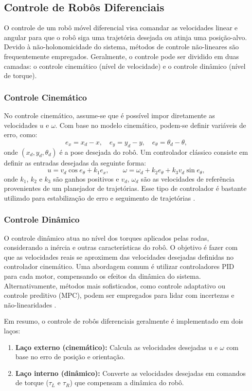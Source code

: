 \subsection{Controle de Robôs Diferenciais}
O controle de um robô móvel diferencial visa comandar as velocidades linear e angular para que o robô siga uma trajetória desejada ou atinja uma posição-alvo. Devido à não-holonomicidade do sistema, métodos de controle não-lineares são frequentemente empregados. Geralmente, o controle pode ser dividido em duas camadas: o controle cinemático (nível de velocidade) e o controle dinâmico (nível de torque).

\subsubsection{Controle Cinemático}
No controle cinemático, assume-se que é possível impor diretamente as velocidades $u$ e $\omega$. Com base no modelo cinemático, podem-se definir variáveis de erro, como:
\[
e_x = x_d - x, \quad e_y = y_d - y, \quad e_\theta = \theta_d - \theta,
\]
onde $(x_d, y_d, \theta_d)$ é a pose desejada do robô. Um controlador clássico consiste em definir as entradas desejadas da seguinte forma:
\begin{equation}\label{eq:controle_cinematico}
    u = v_d \cos e_\theta + k_1 e_x, \qquad \omega = \omega_d + k_2 e_\theta + k_3 v_d \sin e_\theta,
\end{equation}
onde $k_1$, $k_2$ e $k_3$ são ganhos positivos e $v_d$, $\omega_d$ são as velocidades de referência provenientes de um planejador de trajetórias. Esse tipo de controlador é bastante utilizado para estabilização de erro e seguimento de trajetórias \cite{Kanayama1990}.

\subsubsection{Controle Dinâmico}
O controle dinâmico atua no nível dos torques aplicados pelas rodas, considerando a inércia e outras características do robô. O objetivo é fazer com que as velocidades reais se aproximem das velocidades desejadas definidas no controlador cinemático. Uma abordagem comum é utilizar controladores PID para cada motor, compensando os efeitos da dinâmica do sistema. Alternativamente, métodos mais sofisticados, como controle adaptativo ou controle preditivo (MPC), podem ser empregados para lidar com incertezas e não-linearidades \cite{Harasim2016}.

Em resumo, o controle de robôs diferenciais geralmente é implementado em dois laços:
\begin{enumerate}
    \item \textbf{Laço externo (cinemático):} Calcula as velocidades desejadas $u$ e $\omega$ com base no erro de posição e orientação.
    \item \textbf{Laço interno (dinâmico):} Converte as velocidades desejadas em comandos de torque ($\tau_L$ e $\tau_R$) que compensam a dinâmica do robô.
\end{enumerate}

